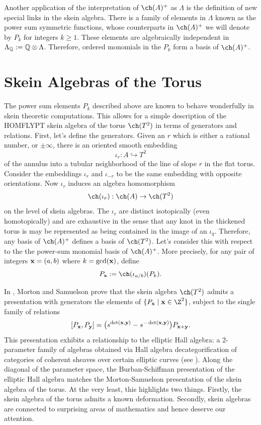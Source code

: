 Another application of the interpretation of $\ch(A)^+$ as $\Lambda$ is the definition of new special links in the skein algebra. There is a family of elements in $\Lambda$ known as the power sum symmetric functions, whose counterparts in $\ch(A)^+$ we will denote by $P_k$ for integers $k \geq 1$. These elements are algebraically independent in $\Lambda_{\mathbb{Q}} := \mathbb{Q} \otimes \Lambda$. Therefore, ordered monomials in the $P_k$ form a basis of $\ch(A)^+$.


\section{Skein Algebras of the Torus}

The power sum elements $P_k$ described above are known to behave wonderfully in skein theoretic computations. This allows for a simple description of the HOMFLYPT skein algebra of the torus $\ch(T^2)$ in terms of generators and relations. First, let's define the generators. Given an $r$ which is either a rational number, or $\pm \infty$, there is an oriented smooth embedding 
\[
\iota_{r}: A \hookrightarrow T^2
\]
of the annulus into a tubular neighborhood of the line of slope $r$ in the flat torus. Consider the embeddings $\iota_{r}$ and $\iota_{-r}$ to be the same embedding with opposite orientations. Now $\iota_r$ induces an algebra homomorphism
\[
\ch(\iota_r): \ch(A) \to \ch(T^2)
\]
on the level of skein algebras. The $\iota_r$ are distinct isotopically (even homotopically) and are exhaustive in the sense that any knot in the thickened torus is may be represented as being contained in the image of an $\iota_q$. Therefore, any basis of $\ch(A)^+$ defines a basis of $\ch(T^2)$. Let's consider this with respect to the the power-sum monomial basis of $\ch(A)^+$. More precisely, for any pair of integers ${\mathbf{x}} = (a, b)$ where $k = \gcd({\mathbf{x}})$, define 
\[
P_\xx := \ch(\iota_{a/b})(P_k).
\]

In , Morton and Samuelson prove that the skein algebra $\ch(T^2)$ admits a presentation with generators the elements of $\{ P_\xx \mid \xx \in \Z^2 \}$, subject to the single family of relations 
\[
[P_{\mathbf{x}}, P_{\mathbf{y}}] = \big( s^{\det({\mathbf{x}},{\mathbf{y}})} - s^{-\det({\mathbf{x}},{\mathbf{y}})} \big) P_{{\mathbf{x}} + {\mathbf{y}}}.
\]
This presentation exhibits a relationship to the elliptic Hall algebra: a 2-parameter family of algebras obtained via Hall algebra decategorification of categories of coherent sheaves over certain elliptic curves (see ). Along the diagonal of the parameter space, the Burban-Schiffman presentation of the elliptic Hall algebra matches the Morton-Samuelson presentation of the skein algebra of the torus. At the very least, this highlights two things. Firstly, the skein algebra of the torus admits a known deformation. Secondly, skein algebras are connected to surprising areas of mathematics and hence deserve our attention. 

